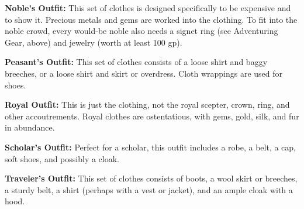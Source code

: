 \textbf{Noble's Outfit:} This set of clothes is designed specifically to be expensive 
and to show it. Precious metals and gems are worked into the clothing. To fit into 
the noble crowd, every would-be noble also needs a signet ring (see Adventuring 
Gear, above) and jewelry (worth at least 100 gp).

\textbf{Peasant's Outfit:} This set of clothes consists of a loose shirt and baggy 
breeches, or a loose shirt and skirt or overdress. Cloth wrappings are used for 
shoes.

\textbf{Royal Outfit:} This is just the clothing, not the royal scepter, crown, 
ring, and other accoutrements. Royal clothes are ostentatious, with gems, gold, 
silk, and fur in abundance.

\textbf{Scholar's Outfit:} Perfect for a scholar, this outfit includes a robe, 
a belt, a cap, soft shoes, and possibly a cloak.

\textbf{Traveler's Outfit:} This set of clothes consists of boots, a wool skirt 
or breeches, a sturdy belt, a shirt (perhaps with a vest or jacket), and an ample 
cloak with a hood.